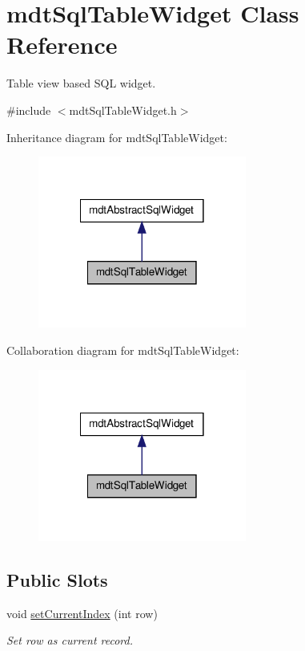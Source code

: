 \hypertarget{classmdt_sql_table_widget}{
\section{mdtSqlTableWidget Class Reference}
\label{classmdt_sql_table_widget}
}


Table view based SQL widget.  




{\ttfamily \#include $<$mdtSqlTableWidget.h$>$}



Inheritance diagram for mdtSqlTableWidget:\nopagebreak
\begin{figure}[H]
\begin{center}
\leavevmode
\includegraphics[width=194pt]{classmdt_sql_table_widget__inherit__graph}
\end{center}
\end{figure}


Collaboration diagram for mdtSqlTableWidget:\nopagebreak
\begin{figure}[H]
\begin{center}
\leavevmode
\includegraphics[width=194pt]{classmdt_sql_table_widget__coll__graph}
\end{center}
\end{figure}
\subsection*{Public Slots}
\begin{DoxyCompactItemize}
\item 
void \hyperlink{classmdt_sql_table_widget_ae4945234973dcfcb8f2e20830e571fd4}{setCurrentIndex} (int row)
\begin{DoxyCompactList}\small\item\em Set row as current record. \end{DoxyCompactList}\end{DoxyCompactItemize}
